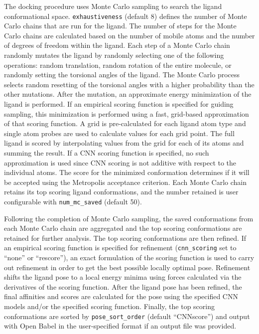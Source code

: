\documentclass[journal=jcisd8,manuscript=article]{achemso}
\begin{document}
The docking procedure uses Monte Carlo sampling to search the ligand conformational space. \texttt{exhaustiveness} (default 8) defines the number of Monte Carlo chains that are run for the ligand. The number of steps for the Monte Carlo chains are calculated based on the number of mobile atoms and the number of degrees of freedom within the ligand. Each step of a Monte Carlo chain randomly mutates the ligand by randomly selecting one of the following operations: random translation, random rotation of the entire molecule, or randomly setting the torsional angles of the ligand. The Monte Carlo process selects random resetting of the torsional angles with a higher probability than the other mutations. After the mutation, an approximate energy minimization of the ligand is performed. If an empirical scoring function is specified for guiding sampling, this minimization is performed using a fast, grid-based approximation of that scoring function. A grid is pre-calculated for each ligand atom type and single atom probes are used to calculate values for each grid point.  The full ligand is scored by interpolating values from the grid for each of its atoms and summing the result.  If a CNN scoring function is specified, no such approximation is used since CNN scoring is not additive with respect to the individual atoms\cite{hochuli2018visualizing}.
 The score for the minimized conformation determines if it will be accepted using the Metropolis acceptance criterion. Each Monte Carlo chain retains its top scoring ligand conformations, and the number retained is user configurable with \texttt{num\_mc\_saved} (default 50).

Following the completion of Monte Carlo sampling, the saved conformations from each Monte Carlo chain are aggregated and the top scoring conformations are retained for further analysis. The top scoring conformations are then refined. If an empirical scoring function is specified for refinement (\texttt{cnn\_scoring} set to ``none'' or ``rescore''), an exact formulation of the scoring function is used to carry out refinement in order to get the best possible locally optimal pose. Refinement shifts the ligand pose to a local energy minima using forces calculated via the derivatives of the scoring function. After the ligand pose has been refined, the final affinities and scores are calculated for the pose using the specified CNN models and/or the specified scoring function. Finally, the top scoring conformations are sorted by \texttt{pose\_sort\_order} (default ``CNNscore'') and output with Open Babel in the user-specified format if an output file was provided.
\end{document}
